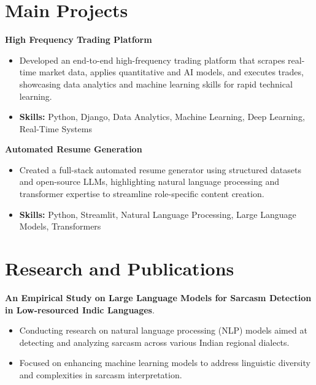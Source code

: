 \documentclass[a4paper,11pt]{article}
\begin{document}
\section{\textbf{Main Projects}}

\vspace{1mm}
  \textbf{High Frequency Trading Platform  }
\vspace{-1.5mm} %
\begin{itemize}
  \item Developed an end-to-end high-frequency trading platform that scrapes real-time market data, applies quantitative and AI models, and executes trades, showcasing data analytics and machine learning skills for rapid technical learning.
\vspace{-3mm}
  \item \textbf{Skills:} Python, Django, Data Analytics, Machine Learning, Deep Learning, Real-Time Systems
\end{itemize}


\vspace{1mm}
   \textbf{Automated Resume Generation }
\vspace{-1.5mm} %
\begin{itemize}
  \item Created a full-stack automated resume generator using structured datasets and open-source LLMs, highlighting natural language processing and transformer expertise to streamline role-specific content creation.
\vspace{-3mm}
  \item \textbf{Skills:} Python, Streamlit, Natural Language Processing, Large Language Models, Transformers
\end{itemize}



\section{\textbf{Research and Publications} \hfill }
\vspace{1mm}
  \textbf{An Empirical Study on Large Language Models for Sarcasm Detection in Low-resourced Indic Languages}.
\vspace{-1mm} %
\begin{itemize}
  \item Conducting research on natural language processing (NLP) models aimed at detecting and analyzing sarcasm across various Indian regional dialects.
\vspace{-3mm}
  \item Focused on enhancing machine learning models to address linguistic diversity and complexities in sarcasm interpretation.
\end{itemize}
\end{document}
